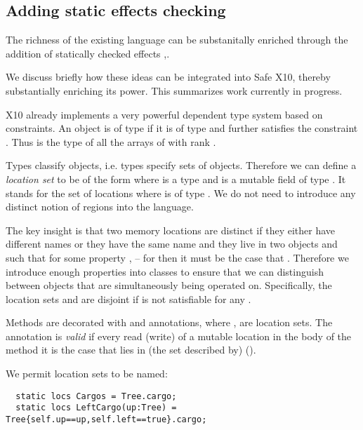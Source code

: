 
\subsection{Adding static effects checking}

The richness of the existing language can be substanitally enriched
through the addition of statically checked effects
\cite{Gifford:1986:IFI:319838.319848},\cite{DPJ}. 

We discuss briefly how these ideas can be integrated into Safe X10,
thereby substantially enriching its power. This summarizes work
currently in progress.

X10 already implements a very powerful dependent type system based on
constraints. An object  is of type  if it is of
type  and further satisfies the constraint
. Thus  is the type of all
the arrays of  with rank . 

Types classify objects, i.e.{} types specify sets of
objects. Therefore we can define a {\em location set} to be of the form
 where  is a type and  is a mutable field of
type . It stands for the set of locations  where
 is of type . We do not need to introduce any distinct
notion of regions into the language.

The key insight is that two memory locations are distinct if they
either have different names or they have the same name  and
they live in two objects  and such that for some
property ,  -- for then it must be the case
that . Therefore we introduce enough properties into
classes to ensure that we can distinguish between objects that are
simultaneously being operated on. Specifically, the location sets
 and  are disjoint if
 is not satisfiable for any .

Methods are decorated with  and 
annotations, where , are location sets. The annotation
is {\em valid} if every read (write) of a mutable location  in the
body of the method it is the case that  lies in (the set
described by)  ().

We permit location sets to be named:
\begin{lstlisting}
  static locs Cargos = Tree.cargo;
  static locs LeftCargo(up:Tree) = Tree{self.up==up,self.left==true}.cargo;
\end{lstlisting}

